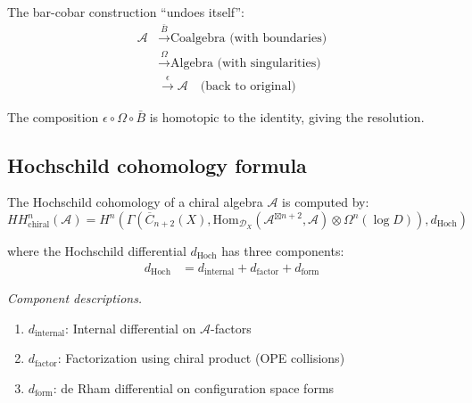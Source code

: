 \begin{remark}
The bar-cobar construction ``undoes itself'':
\begin{align*}
\mathcal{A} &\xrightarrow{\bar{B}} \text{Coalgebra (with boundaries)}\\
&\xrightarrow{\Omega} \text{Algebra (with singularities)}\\
&\xrightarrow{\epsilon} \mathcal{A} \quad \text{(back to original)}
\end{align*}

The composition $\epsilon \circ \Omega \circ \bar{B}$ is homotopic to the identity, giving
the resolution.
\end{remark}

\subsection{Hochschild cohomology formula}

\begin{theorem}\label{thm:HH-config-space-formula}
The Hochschild cohomology of a chiral algebra $\mathcal{A}$ is computed by:
\[HH^n_{\text{chiral}}(\mathcal{A}) = H^n\left(\Gamma\left(\overline{C}_{n+2}(X), 
\text{Hom}_{\mathcal{D}_X}(\mathcal{A}^{\boxtimes n+2}, \mathcal{A}) \otimes \Omega^n(\log D)\right), d_{\text{Hoch}}\right)\]

where the Hochschild differential $d_{\text{Hoch}}$ has three components:
\begin{align}
d_{\text{Hoch}} &= d_{\text{internal}} + d_{\text{factor}} + d_{\text{form}} \label{eq:d-Hoch-decomposition}
\end{align}

\emph{Component descriptions.}
\begin{enumerate}
\item $d_{\text{internal}}$: Internal differential on $\mathcal{A}$-factors
\item $d_{\text{factor}}$: Factorization using chiral product (OPE collisions)
\item $d_{\text{form}}$: de Rham differential on configuration space forms
\end{enumerate}
\end{theorem}

